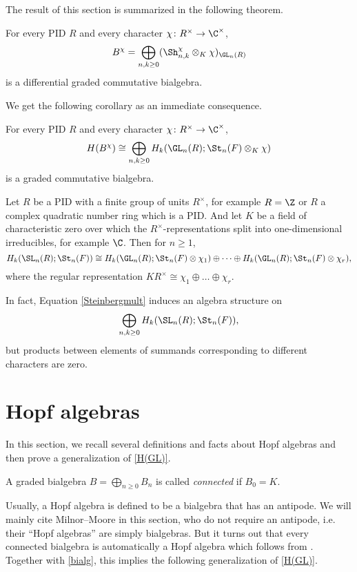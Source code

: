 The result of this section is summarized in the following theorem.

\begin{theorem}
For every PID $R$ and every character $\chi\colon R^\times \to \C^\times$, 
\[ B^\chi = \bigoplus_{n,k\ge0} (\Sh^\chi_{n,k} \otimes_K \chi)_{\GL_n(R)}\]
is a differential graded commutative bialgebra.
\end{theorem}

We get the following corollary as an immediate consequence.

\begin{corollary}\label{bialg}
For every PID $R$ and every character $\chi\colon R^\times \to \C^\times$, 
\[ H(B^\chi) \cong \bigoplus_{n,k\ge0} H_k(\GL_n(R); \St_n(F) \otimes_K \chi)\]
is a graded commutative bialgebra.
\end{corollary}

\begin{remark}
Let $R$ be a PID with a finite group of units $R^\times$, for example $R= \Z$ or $R$ a complex quadratic number ring which is a PID. And let $K$ be a field of characteristic zero over which the $R^\times$-representations split into one-dimensional irreducibles, for example $\C$. Then for $n\ge 1$, 
\[ H_k(\SL_n(R); \St_n(F)) \cong H_k(\GL_n(R); \St_n(F) \otimes \chi_1) \oplus \dots \oplus H_k(\GL_n(R); \St_n(F) \otimes \chi_r),\]
where the regular representation $KR^\times \cong \chi_1 \oplus \dots \oplus \chi_r$.

In fact, Equation \eqref{Steinbergmult} induces an algebra structure on
\[ \bigoplus_{n,k\ge 0} H_k(\SL_n(R); \St_n(F)),\]
but products between elements of summands corresponding to different characters are zero.
\end{remark}


\section{Hopf algebras}

In this section, we recall several definitions and facts about Hopf algebras and then prove a generalization of \autoref{H(GL)}.

A graded bialgebra $B = \bigoplus_{n\ge 0} B_n$ is called \emph{connected} if $B_0 = K$.

Usually, a Hopf algebra is defined to be a bialgebra that has an antipode. We will mainly cite Milnor--Moore \cite{MM} in this section, who do not require an antipode, i.e. their ``Hopf algebras'' are simply bialgebras. But it turns out that every connected bialgebra is automatically a Hopf algebra which follows from \cite[Proposition 8.2]{MM}. Together with \autoref{bialg}, this implies the following generalization of \autoref{H(GL)}.

